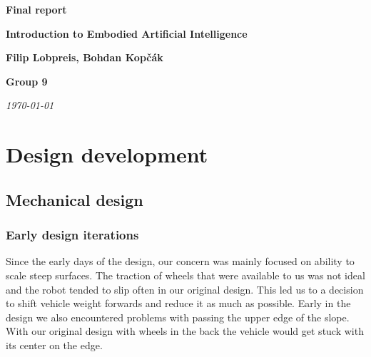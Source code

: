 \documentclass{article}
\date{\today} %
\begin{document}
\begin{center}
	\vspace*{\fill}
	\Huge\textbf{Final report}\par
	\vspace{0.2cm}
	\Large\textbf{Introduction to Embodied Artificial Intelligence}\par
	\vspace{2cm}
	\large\textbf{Filip Lobpreis, Bohdan Kopčák}\par
	\vspace{0.2cm}
	\large\textbf{Group 9}\par
	\vspace{1cm}
	\large\textit{\today}\par
	\vspace*{\fill}
\end{center}


\section{Design development}
\label{sec:development}

\subsection{Mechanical design}
\label{subsec:mechanical_design}

\subsubsection{Early design iterations}

Since the early days of the design, our concern was mainly focused on ability to scale steep surfaces. The traction of
wheels that were available to us was not ideal and the robot tended to slip often in our original design. This led us
to a decision to shift vehicle weight forwards and reduce it as much as possible. Early in the design we also
encountered problems with passing the upper edge of the slope. With our original design with wheels in the back 
the vehicle would get stuck with its center on the edge.
\end{document}
